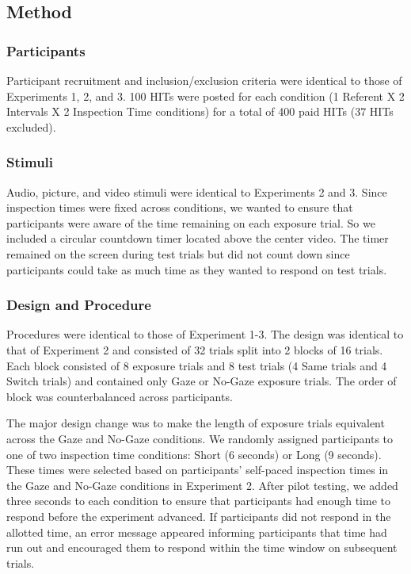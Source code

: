 \documentclass[authoryear, review]{elsarticle}
\begin{document}
\subsection{Method}\label{method-3}

\subsubsection{Participants}\label{participants-3}

Participant recruitment and inclusion/exclusion criteria were identical
to those of Experiments 1, 2, and 3. 100 HITs were posted for each
condition (1 Referent X 2 Intervals X 2 Inspection Time conditions) for
a total of 400 paid HITs (37 HITs excluded).

\subsubsection{Stimuli}\label{stimuli-2}

Audio, picture, and video stimuli were identical to Experiments 2 and 3.
Since inspection times were fixed across conditions, we wanted to ensure
that participants were aware of the time remaining on each exposure
trial. So we included a circular countdown timer located above the
center video. The timer remained on the screen during test trials but
did not count down since participants could take as much time as they
wanted to respond on test trials.

\subsubsection{Design and Procedure}\label{design-and-procedure-3}

Procedures were identical to those of Experiment 1-3. The design was
identical to that of Experiment 2 and consisted of 32 trials split into
2 blocks of 16 trials. Each block consisted of 8 exposure trials and 8
test trials (4 Same trials and 4 Switch trials) and contained only Gaze
or No-Gaze exposure trials. The order of block was counterbalanced
across participants.

The major design change was to make the length of exposure trials
equivalent across the Gaze and No-Gaze conditions. We randomly assigned
participants to one of two inspection time conditions: Short (6 seconds)
or Long (9 seconds). These times were selected based on participants'
self-paced inspection times in the Gaze and No-Gaze conditions in
Experiment 2. After pilot testing, we added three seconds to each
condition to ensure that participants had enough time to respond before
the experiment advanced. If participants did not respond in the allotted
time, an error message appeared informing participants that time had run
out and encouraged them to respond within the time window on subsequent
trials.
\end{document}

